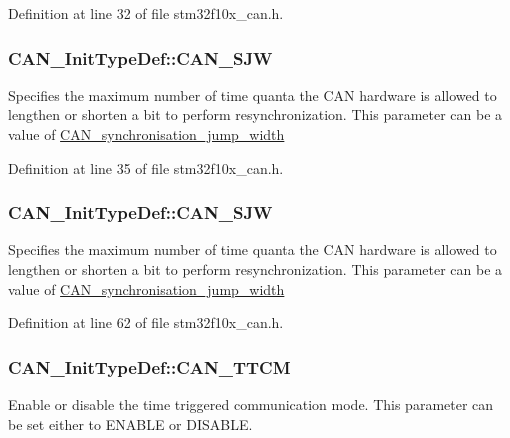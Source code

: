 Definition at line 32 of file stm32f10x\+\_\+can.\+h.

\subsubsection[{\texorpdfstring{C\+A\+N\+\_\+\+S\+JW}{CAN_SJW}}]{ C\+A\+N\+\_\+\+Init\+Type\+Def\+::\+C\+A\+N\+\_\+\+S\+JW}\hypertarget{struct_c_a_n___init_type_def_af3349cf58963dc25cadb34cf8367418a}{}\label{struct_c_a_n___init_type_def_af3349cf58963dc25cadb34cf8367418a}
Specifies the maximum number of time quanta the C\+AN hardware is allowed to lengthen or shorten a bit to perform resynchronization. This parameter can be a value of \hyperlink{group___c_a_n__synchronisation__jump__width}{C\+A\+N\+\_\+synchronisation\+\_\+jump\+\_\+width} 

Definition at line 35 of file stm32f10x\+\_\+can.\+h.

\subsubsection[{\texorpdfstring{C\+A\+N\+\_\+\+S\+JW}{CAN_SJW}}]{ C\+A\+N\+\_\+\+Init\+Type\+Def\+::\+C\+A\+N\+\_\+\+S\+JW}\hypertarget{struct_c_a_n___init_type_def_addac271c43490cb37ac7293f7bf201c2}{}\label{struct_c_a_n___init_type_def_addac271c43490cb37ac7293f7bf201c2}
Specifies the maximum number of time quanta the C\+AN hardware is allowed to lengthen or shorten a bit to perform resynchronization. This parameter can be a value of \hyperlink{group___c_a_n__synchronisation__jump__width}{C\+A\+N\+\_\+synchronisation\+\_\+jump\+\_\+width} 

Definition at line 62 of file stm32f10x\+\_\+can.\+h.

\subsubsection[{\texorpdfstring{C\+A\+N\+\_\+\+T\+T\+CM}{CAN_TTCM}}]{ C\+A\+N\+\_\+\+Init\+Type\+Def\+::\+C\+A\+N\+\_\+\+T\+T\+CM}\hypertarget{struct_c_a_n___init_type_def_aa53ceafdcf1a9a5c9a6566006c9a4b60}{}\label{struct_c_a_n___init_type_def_aa53ceafdcf1a9a5c9a6566006c9a4b60}
Enable or disable the time triggered communication mode. This parameter can be set either to E\+N\+A\+B\+LE or D\+I\+S\+A\+B\+LE. 

